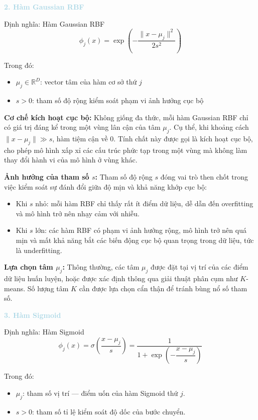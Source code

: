 \noindent\textcolor{lightblue}{\textbf{2. Hàm Gaussian RBF}}

\begin{infobox}{Định nghĩa: Hàm Gaussian RBF}
$$\phi_{j}(x)=\exp\left(-\frac{\|x-\mu_{j}\|^{2}}{2s^{2}}\right)$$

Trong đó:
\begin{itemize}
    \item $\mu_j \in \mathbb{R}^D$: vector tâm của hàm cơ sở thứ $j$
    \item $s > 0$: tham số độ rộng kiểm soát phạm vi ảnh hưởng cục bộ
\end{itemize}
\end{infobox}

\textbf{Cơ chế kích hoạt cục bộ:} Không giống đa thức, mỗi hàm Gaussian RBF chỉ có giá trị đáng kể trong một vùng lân cận của tâm $\mu_j$. Cụ thể, khi khoảng cách $\|x - \mu_j\| \gg s$, hàm tiệm cận về 0. Tính chất này được gọi là kích hoạt cục bộ, cho phép mô hình xấp xỉ các cấu trúc phức tạp trong một vùng mà không làm thay đổi hành vi của mô hình ở vùng khác.

\textbf{Ảnh hưởng của tham số $s$:} Tham số độ rộng $s$ đóng vai trò then chốt trong việc kiểm soát sự đánh đổi giữa độ mịn và khả năng khớp cục bộ:
\begin{itemize}
    \item Khi $s$ nhỏ: mỗi hàm RBF chỉ thấy rất ít điểm dữ liệu, dễ dẫn đến overfitting và mô hình trở nên nhạy cảm với nhiễu.
    \item Khi $s$ lớn: các hàm RBF có phạm vi ảnh hưởng rộng, mô hình trở nên quá mịn và mất khả năng bắt các biến động cục bộ quan trọng trong dữ liệu, tức là underfitting.
\end{itemize}

\textbf{Lựa chọn tâm $\mu_j$:} Thông thường, các tâm $\mu_j$ được đặt tại vị trí của các điểm dữ liệu huấn luyện, hoặc được xác định thông qua giải thuật phân cụm như $K$-means. Số lượng tâm $K$ cần được lựa chọn cẩn thận để tránh bùng nổ số tham số.

\noindent\textcolor{lightblue}{\textbf{3. Hàm Sigmoid}}

\begin{infobox}{Định nghĩa: Hàm Sigmoid}
$$\phi_{j}(x)=\sigma\left(\frac{x-\mu_{j}}{s}\right) = \frac{1}{1 + \exp\left(-\dfrac{x-\mu_{j}}{s}\right)}$$

Trong đó:
\begin{itemize}
    \item $\mu_j$: tham số vị trí — điểm uốn của hàm Sigmoid thứ $j$.
    \item $s > 0$: tham số tỉ lệ kiểm soát độ dốc của bước chuyển.
\end{itemize}
\end{infobox}

